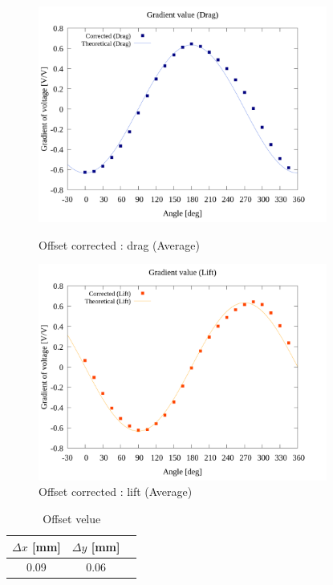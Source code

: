 \begin{figure}[htbp]
		\centering
		\includegraphics[width=95mm]{../../02_workspace/result/2-ex/plot/21/21-2_corrected_offset_drag.png}
		\caption{Offset corrected : drag (Average)}
		\includegraphics[width=95mm]{../../02_workspace/result/2-ex/plot/21/21-2_corrected_offset_lift.png}
		\caption{Offset corrected : lift (Average)}
\end{figure}

\begin{table}[htbp]
  \begin{center}
      \caption{Offset velue}
      \begin{tabular}{|p{30mm}|p{20mm}|p{20mm}|}
          \hline
          \multicolumn{1}{|c|}{$\Delta x$ [mm]} & \multicolumn{1}{|c|}{$\Delta y$ [mm]} \\ \hline
          \multicolumn{1}{|c|}{0.09}           & \multicolumn{1}{|c|}{0.06}           \\ \hline
      \end{tabular}
  \end{center}
\end{table}

\newpage

